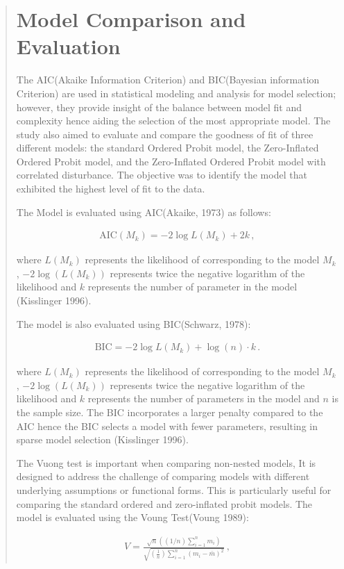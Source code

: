\documentclass[12]{report}
\begin{document}
\begin{quote}
{ \section{Model Comparison and Evaluation}
 The AIC(Akaike Information Criterion) and BIC(Bayesian information Criterion) are  used in statistical modeling and analysis for model selection; however, they provide insight of the balance between model fit and complexity hence aiding the selection of the most appropriate model. The study also aimed to evaluate and compare the goodness of fit of three different models: the standard Ordered Probit model, the Zero-Inflated Ordered Probit model, and the Zero-Inflated Ordered Probit model with correlated disturbance. The objective was to identify the model that exhibited the highest level of fit to the data.
  
 The Model is evaluated using AIC(Akaike, 1973) as follows: 
\begin{fleqn}
\begin{align*}
\text{AIC}(M_k) = -2 \log L(M_k) + 2 k \, ,
\tag{4.5.1}
\end{align*}
\end{fleqn}
where $L(M_k)$ represents the likelihood of corresponding to the model $M_k$, $-2\log(L(M_k))$ represents twice the negative logarithm of the likelihood and $k$ represents the number of parameter in the model (Kisslinger 1996).
\vspace{0.3cm}

The model is also evaluated using BIC(Schwarz, 1978):
\begin{fleqn}
\begin{align*}
\text{BIC} = -2 \log L (M_k) + \log(n) \cdot k \, .
\tag{4.5.2}
\end{align*}
\end{fleqn}

where $L(M_k)$ represents the likelihood of corresponding to the model $M_k$, $-2\log(L(M_k))$ represents twice the negative logarithm of the likelihood and $k$ represents the number of parameters in the model and $n$ is the sample size. The BIC incorporates a larger penalty compared to the AIC hence the BIC selects a model with fewer parameters, resulting in sparse model selection (Kisslinger 1996).
\vspace{0.3cm}



The Vuong test is important when comparing non-nested models, It is designed to address the challenge of comparing models with different underlying assumptions or functional forms. This is particularly useful for comparing the standard ordered and zero-inflated probit models.
The model is evaluated using the Voung Test(Voung 1989):
\begin{fleqn}
\begin{align*}
V = \frac{\sqrt{n} \left((1/ n) \sum_{i=1}^{n} m_i\right)}{\sqrt{\left(\frac{1}{n}\right)\sum_{i=1}^{n} (m_i - \bar{m})^2}} \, ,
\tag{4.5.3}
\end{align*}
\end{fleqn}

}
\end{quote}
\end{document}
